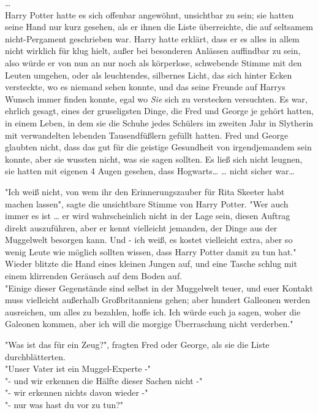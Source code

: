 {…\\ Harry Potter hatte es sich offenbar angewöhnt, unsichtbar zu sein; sie hatten seine Hand nur kurz gesehen, als er ihnen die Liste überreichte, die auf seltsamem nicht-Pergament geschrieben war. Harry hatte erklärt, dass er es alles in allem nicht wirklich für klug hielt, außer bei besonderen Anlässen auffindbar zu sein, also würde er von nun an nur noch als körperlose, schwebende Stimme mit den Leuten umgehen, oder als leuchtendes, silbernes Licht, das sich hinter Ecken versteckte, wo es niemand sehen konnte, und das seine Freunde auf Harrys Wunsch immer finden konnte, egal wo \emph{Sie} sich zu verstecken versuchten. Es war, ehrlich gesagt, eines der gruseligsten Dinge, die Fred und George je gehört hatten, in einem Leben, in dem sie die Schuhe jedes Schülers im zweiten Jahr in Slytherin mit verwandelten lebenden Tausendfüßlern gefüllt hatten. Fred und George glaubten nicht, dass das gut für die geistige Gesundheit von irgendjemandem sein konnte, aber sie wussten nicht, was sie sagen sollten. Es ließ sich nicht leugnen, sie hatten mit eigenen 4 Augen gesehen, dass Hogwarts… … nicht sicher war…

"Ich weiß nicht, von wem ihr den Erinnerungszauber für Rita Skeeter habt machen lassen", sagte die unsichtbare Stimme von Harry Potter. "Wer auch immer es ist … er wird wahrscheinlich nicht in der Lage sein, diesen Auftrag direkt auszuführen, aber er kennt vielleicht jemanden, der Dinge aus der Muggelwelt besorgen kann. Und - ich weiß, es kostet vielleicht extra, aber so wenig Leute wie möglich sollten wissen, dass Harry Potter damit zu tun hat."\\ Wieder blitzte die Hand eines kleinen Jungen auf, und eine Tasche schlug mit einem klirrenden Geräusch auf dem Boden auf.\\ "Einige dieser Gegenstände sind selbst in der Muggelwelt teuer, und euer Kontakt muss vielleicht außerhalb Großbritanniens gehen; aber hundert Galleonen werden ausreichen, um alles zu bezahlen, hoffe ich. Ich würde euch ja sagen, woher die Galeonen kommen, aber ich will die morgige Überraschung nicht verderben."

"Was ist das für ein Zeug?", fragten Fred oder George, als sie die Liste durchblätterten.\\ "Unser Vater ist ein Muggel-Experte -"\\ "- und wir erkennen die Hälfte dieser Sachen nicht -"\\ "- wir erkennen nichts davon wieder -"\\ "- nur was hast du vor zu tun?"

}
